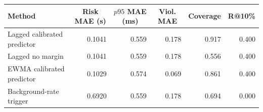 \begin{tabular}{lrrrrr}
\hline
Method &
\multicolumn{1}{c}{Risk MAE (s)} &
\multicolumn{1}{c}{$p95$ MAE (ms)} &
\multicolumn{1}{c}{Viol. MAE} &
\multicolumn{1}{c}{Coverage} &
\multicolumn{1}{c}{R@10\%} \\
\hline
Lagged calibrated predictor & 0.1041 & 0.559 & 0.178 & 0.917 & 0.400 \\
Lagged no margin & 0.1041 & 0.559 & 0.178 & 0.556 & 0.400 \\
EWMA calibrated predictor & 0.1029 & 0.574 & 0.069 & 0.861 & 0.400 \\
Background-rate trigger & 0.6920 & 0.559 & 0.178 & 0.694 & 0.000 \\
\hline
\end{tabular}
